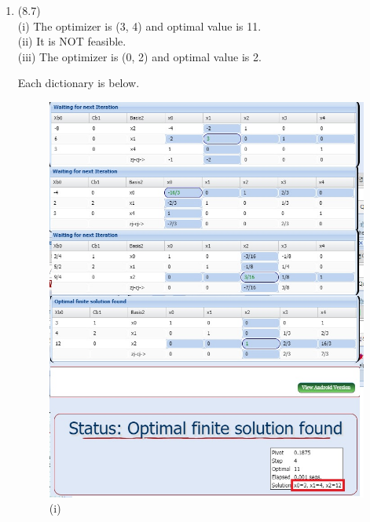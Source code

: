 \documentclass[letterpaper,12pt]{article}
\theoremstyle{definition}
\begin{document}
\begin{enumerate}
	\item (8.7) \\
(i) The optimizer is (3, 4) and optimal value is 11.\\
(ii) It is NOT feasible.\\
(iii) The optimizer is (0, 2) and optimal value is 2.

Each dictionary is below.

\begin{figure}[htbp]
\begin{center}
    \includegraphics[scale=0.46]{8p7a}
    \caption{(i)} \label{fig:label}
\end{center}
\end{figure}


\end{enumerate}
\end{document}
